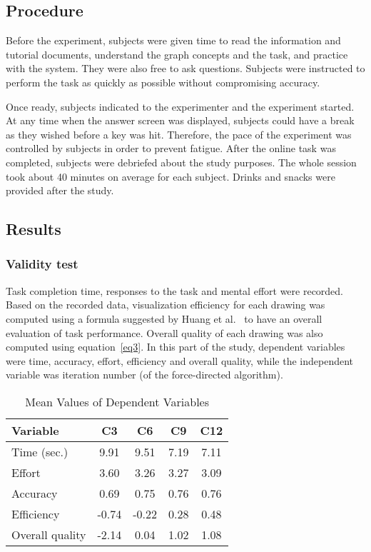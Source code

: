 \documentclass[conference,letterpaper]{IEEEtran}
\begin{document}
\subsection{Procedure}


Before the experiment, subjects were given time to read the information and tutorial documents, understand the graph concepts and the task, and practice with the system. They were also free to ask questions. Subjects were instructed to perform the task as quickly as possible without compromising accuracy.

Once ready, subjects indicated to the experimenter and the experiment started. At any time when the answer screen was displayed, subjects could have a break as they wished before a key was hit. Therefore, the pace of the experiment was controlled by subjects in order to prevent fatigue. After the online task was completed, subjects were debriefed about the study purposes. The whole session took about 40 minutes on average for each subject. Drinks and snacks were provided after the study.




\subsection{Results}

\subsubsection{Validity test}

Task completion time, responses to the task and mental effort were recorded. Based on the recorded data, visualization efficiency for each drawing was computed using a formula suggested by Huang et al.~\cite{huang09} to have an overall evaluation of task performance. Overall quality of each drawing was also computed using equation~\ref{eq3}. In this part of the study, dependent variables were time, accuracy, effort, efficiency and overall quality, while the independent variable was iteration number (of the force-directed algorithm).




\begin{table}[!t]
\renewcommand{\arraystretch}{1.3}

\caption{Mean Values of Dependent Variables}
\label{tbl:average}
\centering
\begin{tabular}{l|c|c|c|c}

\hline
Variable & C3  & C6 & C9 & C12\\
\hline
\hline
 Time (sec.) &  9.91   & 9.51   & 7.19   & 7.11 \\
 Effort      & 3.60    & 3.26   & 3.27   & 3.09 \\
 Accuracy    & 0.69    & 0.75   & 0.76   & 0.76 \\
 Efficiency  & -0.74   &-0.22   & 0.28   & 0.48 \\
\hline
 Overall quality  & -2.14   &0.04   & 1.02   & 1.08 \\
\hline
\end{tabular}
\end{table}
\end{document}
